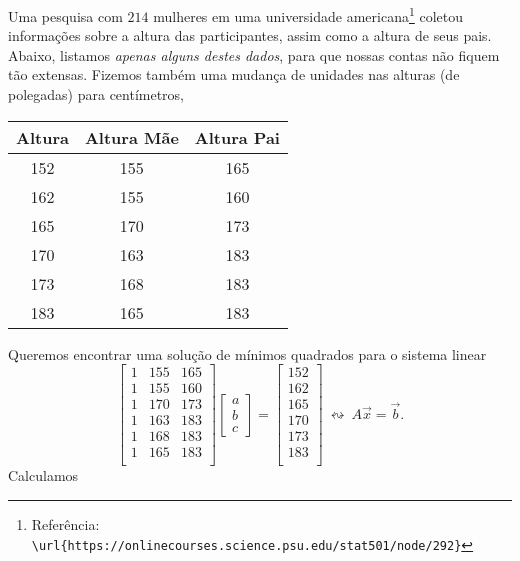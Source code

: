 \documentclass[../livro.tex]{subfiles}  %
\begin{document}
\begin{example}
  Uma pesquisa com $214$ mulheres em uma universidade americana\footnote{Referência: \verb"\url{https://onlinecourses.science.psu.edu/stat501/node/292}"} coletou informações sobre a altura das participantes, assim como a altura de seus pais. Abaixo, listamos \textit{apenas alguns destes dados}, para que nossas contas não fiquem tão extensas. Fizemos também uma mudança de unidades nas alturas (de polegadas) para centímetros,
  \begin{center}
    \begin{tabular}{|c|c|c|}
      \hline
      Altura & Altura Mãe & Altura Pai \\ \hline
      152 & 155 & 165 \\
      162 & 155 & 160 \\
      165 & 170 & 173 \\
      170 & 163 & 183 \\
      173 & 168 & 183 \\
      183 & 165 & 183 \\
      \hline
    \end{tabular}
  \end{center} Queremos encontrar uma solução de mínimos quadrados para o sistema linear
  \[
  \begin{bmatrix}
    1 & 155 & 165 \\
    1 & 155 & 160 \\
    1 & 170 & 173 \\
    1 & 163 & 183 \\
    1 & 168 & 183 \\
    1 & 165 & 183 \\
  \end{bmatrix}
  \begin{bmatrix}
    a \\ b \\ c
  \end{bmatrix} =
  \begin{bmatrix}
    152  \\
    162  \\
    165  \\
    170  \\
    173  \\
    183  \\
  \end{bmatrix} \ \leftrightsquigarrow \ A \vec{x} = \vec{b}.
  \] Calculamos
  \[
\]
\end{example}
\end{document}
